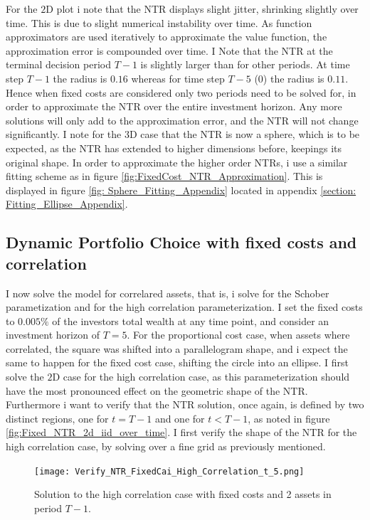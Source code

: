 \documentclass[11pt]{article}
\begin{document}
For the $2$D plot i note that the NTR displays slight jitter, shrinking slightly over time. This is due to slight numerical instability over time. As function approximators
are used iteratively to approximate the value function, the approximation error is compounded over time.
I Note that the NTR at the terminal decision period $T-1$ is slightly larger than for other periods.
At time step $T-1$ the radius is $0.16$ whereas for time step $T-5$ ($0$) the radius is $0.11$.
Hence when fixed costs are considered only two periods need to be solved for, in order to approximate the NTR over the entire investment horizon.
Any more solutions will only add to the approximation error, and the NTR will not change significantly.
I note for the $3$D case that the NTR is now a sphere, which is to be expected, as the NTR has extended to higher dimensions before, keepings its original shape.
In order to approximate the higher order \ac{NTR}s, i use a similar fitting scheme as in figure \ref{fig:FixedCost_NTR_Approximation}.
This is displayed in figure \ref{fig: Sphere_Fitting_Appendix} located in appendix \ref{section: Fitting_Ellipse_Appendix}.

\subsection{Dynamic Portfolio Choice with fixed costs and correlation}
I now solve the model for correlared assets, that is, i solve for the Schober parametization and for the high correlation parameterization.
I set the fixed costs to $0.005\%$ of the investors total wealth at any time point, and consider an investment horizon of $T = 5$.
For the proportional cost case, when assets where correlated, the square was shifted into a parallelogram shape, and i expect the same to happen for the fixed cost case,
shifting the circle into an ellipse. I first solve the $2$D case for the high correlation case, as this parameterization 
should have the most pronounced effect on the geometric shape of the \ac{NTR}. Furthermore i want to verify that the \ac{NTR} solution,
once again, is defined by two distinct regions, one for $t = T-1$ and one for $t < T-1$, as noted in figure \ref{fig:Fixed_NTR_2d_iid_over_time}.
I first verify the shape of the NTR for the high correlation case, by solving over a fine grid as previously mentioned.

\begin{figure}[!ht]
    \centering
    \texttt{[image: Verify\_NTR\_FixedCai\_High\_Correlation\_t\_5.png]}
    \caption{Solution to the high correlation case with fixed costs and 2 assets in period $T-1$.}
    \label{fig:NTR_Verify_High_Correlation}
\end{figure}
\end{document}
